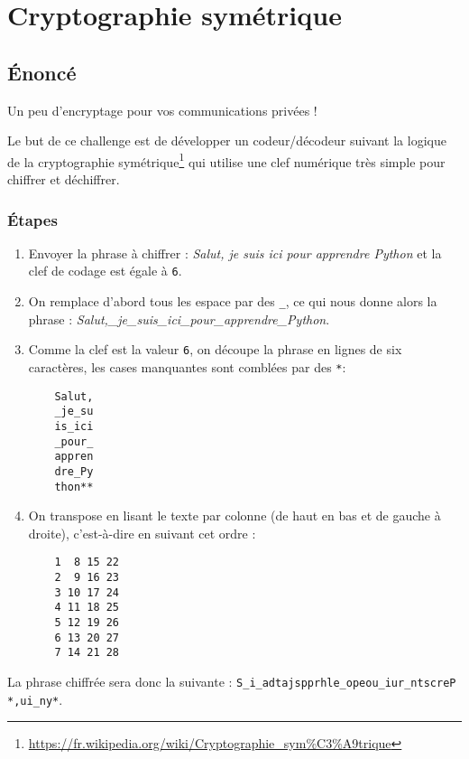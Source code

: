 \chapter{Cryptographie symétrique}
\vspace{2cm}
\section{Énoncé}
Un peu d'encryptage pour vos communications privées !
\medskip

Le but de ce challenge est de développer un codeur/décodeur suivant la logique de la cryptographie symétrique\footnote{\url{https://fr.wikipedia.org/wiki/Cryptographie_sym\%C3\%A9trique}} qui utilise une clef numérique très simple pour chiffrer et déchiffrer.
\medskip

\subsection*{Étapes}
\begin{enumerate}
	\item Envoyer la phrase à chiffrer : \og \textit{Salut, je suis ici pour apprendre Python}\fg{} et la clef de codage est égale à \texttt{6}.
	\medskip
	
	\item On remplace d'abord tous les espace par des \og \texttt{\_}\fg{}, ce qui nous donne alors la phrase : \og \textit{Salut,\_je\_suis\_ici\_pour\_apprendre\_Python}\fg{}.
	\medskip
	
	\item Comme la clef est la valeur \texttt{6}, on découpe la phrase en lignes de six caractères, les cases manquantes sont comblées par des \og \texttt{*}\fg{}:
	\begin{verbatim}
	Salut,
	_je_su
	is_ici
	_pour_
	appren
	dre_Py
	thon**
	\end{verbatim}
	\medskip

	\item On transpose en lisant le texte par colonne (de haut en bas et de gauche à droite), c'est-à-dire en suivant cet ordre :
	\begin{verbatim}
	1  8 15 22
	2  9 16 23
	3 10 17 24
	4 11 18 25
	5 12 19 26
	6 13 20 27
	7 14 21 28
	\end{verbatim}
\end{enumerate}
\medskip

La phrase chiffrée sera donc la suivante : \og \texttt{S\_i\_adtajspprhle\_opeou\_iur\_ntscreP
*,ui\_ny*}\fg{}.
\medskip

